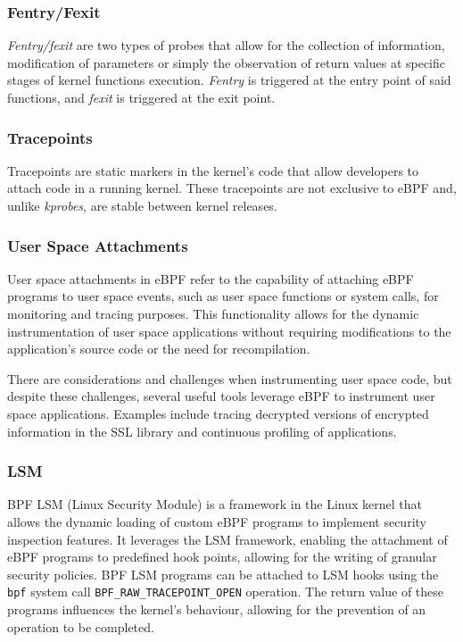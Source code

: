 \subsubsection{Fentry/Fexit}

\textit{Fentry/fexit} are two types of probes that allow for the collection of information, modification of parameters or simply the observation of return values at specific stages of kernel functions execution. \textit{Fentry} is triggered at the entry point of said functions, and \textit{fexit} is triggered at the exit point.

\subsubsection{Tracepoints}

Tracepoints are static markers in the kernel's code that allow developers to attach code in a running kernel. These tracepoints are not exclusive to eBPF and, unlike \textit{kprobes}, are stable between kernel releases.


\subsubsection{User Space Attachments}


User space attachments in eBPF refer to the capability of attaching eBPF programs to user space events, such as user space functions or system calls, for monitoring and tracing purposes. This functionality allows for the dynamic instrumentation of user space applications without requiring modifications to the application's source code or the need for recompilation.

There are considerations and challenges when instrumenting user space code, but despite these challenges, several useful tools leverage eBPF to instrument user space applications. Examples include tracing decrypted versions of encrypted information in the SSL library and continuous profiling of applications.


\subsubsection{LSM}

BPF LSM (Linux Security Module) is a framework in the Linux kernel that allows the dynamic loading of custom eBPF programs to implement security inspection features. It leverages the LSM framework, enabling the attachment of eBPF programs to predefined hook points, allowing for the writing of granular security policies. BPF LSM programs can be attached to LSM hooks using the \texttt{bpf} system call \texttt{BPF\_RAW\_TRACEPOINT\_OPEN} operation. The return value of these programs influences the kernel's behaviour, allowing for the prevention of an operation to be completed. \cite{lsm1} \cite{lsm2}


